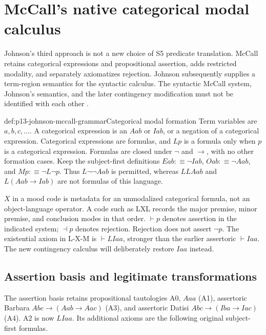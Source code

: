 \section{McCall's native categorical modal calculus}
\label{sec:p13-johnson-mccall}

Johnson's third approach is not a new choice of S5 predicate translation.
McCall retains categorical expressions and propositional assertion, adds
restricted modality, and separately axiomatizes rejection. Johnson subsequently
supplies a term-region semantics for the syntactic calculus. The syntactic
McCall system, Johnson's semantics, and the later contingency modification
must not be identified with each other
\parencite[pp.~265--276]{Johnson2004ModalSyllogisms}.

\begin{hbdefinition}{def:p13-johnson-mccall-grammar}{Categorical modal formation}
Term variables are \(a,b,c,\ldots\). A categorical expression is an \(Aab\)
or \(Iab\), or a negation of a categorical expression. Categorical expressions
are formulas, and \(Lp\) is a formula only when \(p\) is a categorical
expression. Formulas are closed under \(\neg\) and \(\to\), with no other
formation cases. Keep the subject-first definitions
\(Eab\mathrel{:\equiv}\neg Iab\),
\(Oab\mathrel{:\equiv}\neg Aab\), and
\(Mp\mathrel{:\equiv}\neg L\neg p\).
Thus \(L\neg\neg Aab\) is permitted, whereas \(LLAab\) and
\(L(Aab\to Iab)\) are not formulas of this language.
\end{hbdefinition}

\(X\) in a mood code is metadata for an unmodalized categorical formula,
not an object-language operator. A code such as LXL records the major premise,
minor premise, and conclusion modes in that order. \(\vdash p\) denotes
assertion in the indicated system; \(\dashv p\) denotes rejection. Rejection
does not assert \(\neg p\). The existential axiom in L-X-M is
\(\vdash LIaa\), stronger than the earlier assertoric \(\vdash Iaa\).
The new contingency calculus will deliberately restore \(Iaa\) instead.

\subsection{Assertion basis and legitimate transformations}
\label{sec:p13-johnson-mccall-basis}

The assertion basis retains propositional tautologies A0, \(Aaa\) (A1),
assertoric Barbara \(Abc\to(Aab\to Aac)\) (A3), and assertoric Datisi
\(Abc\to(Iba\to Iac)\) (A4). A2 is now \(LIaa\).
Its additional axioms are the following original subject-first formulas.

